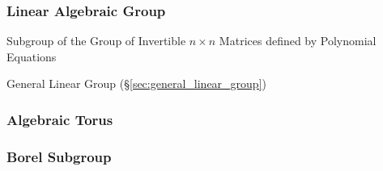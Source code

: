 \subsubsection{Linear Algebraic Group}\label{sec:linear_algebraic_group}

Subgroup of the Group of Invertible $n \times n$ Matrices defined by Polynomial
Equations

General Linear Group (\S\ref{sec:general_linear_group})



\subsubsection{Algebraic Torus}\label{sec:algebraic_torus}

\subsubsection{Borel Subgroup}\label{sec:borel_subgroup}

